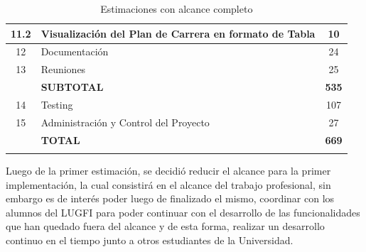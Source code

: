 \documentclass[a4paper]{article}
\begin{document}
\begin{longtable}{| c | l | c |}
\hline
11.2				&	Visualización del Plan de Carrera en formato de Tabla			&	10\\
\hline
12					&	Documentación													&	24\\
\hline
13					&	Reuniones														&	25\\
\hline
					&	\textbf{SUBTOTAL}												&	\textbf{535}\\
\hline
14					&	Testing															&	107\\
\hline
15					&	Administración y Control del Proyecto							&	27\\
\hline
					&	\textbf{TOTAL}													&	\textbf{669}\\
\hline
\caption{Estimaciones con alcance completo}
\end{longtable}


Luego de la primer estimación, se decidió reducir el alcance para la primer implementación, la cual consistirá en el alcance del trabajo profesional, sin embargo es de interés poder luego de finalizado el mismo, coordinar con los alumnos del LUGFI para poder continuar con el desarrollo de las funcionalidades que han quedado fuera del alcance y de esta forma, realizar un desarrollo continuo en el tiempo junto a otros estudiantes de la Universidad.
\end{document}
